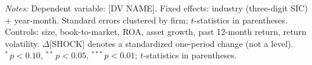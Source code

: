\begin{table}[!htb]
\begin{threeparttable}
\begin{tablenotes}[flushleft]
\footnotesize
\item \textit{Notes:} Dependent variable: [DV NAME]. Fixed effects:
industry (three-digit SIC) $+$ year-month. Standard errors clustered by
firm; $t$-statistics in parentheses. Controls: size, book-to-market,
ROA, asset growth, past 12-month return, return volatility.
$\Delta$[SHOCK] denotes a standardized one-period change (not a level).
${}^{*}\,p<0.10$, ${}^{**}\,p<0.05$, ${}^{***}\,p<0.01$;
$t$-statistics in parentheses.
\end{tablenotes}

\end{threeparttable}
\end{table}
